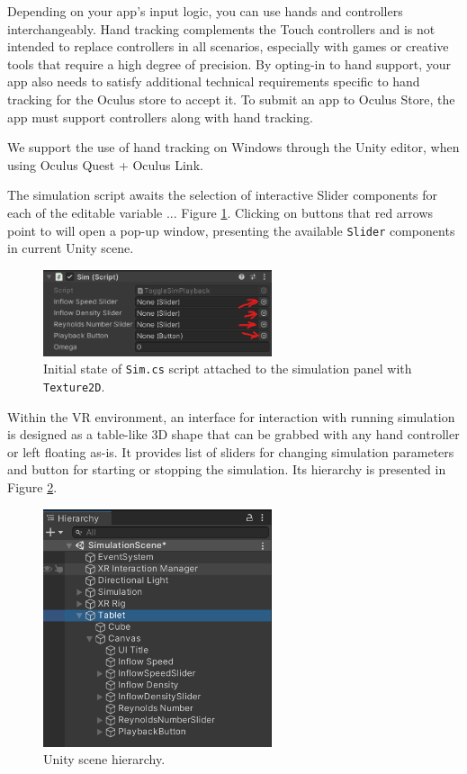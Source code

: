 Depending on your app’s input logic, you can use hands and controllers interchangeably. Hand tracking complements the Touch controllers and is not intended to replace controllers in all scenarios, especially with games or creative tools that require a high degree of precision. By opting-in to hand support, your app also needs to satisfy additional technical requirements specific to hand tracking for the Oculus store to accept it. To submit an app to Oculus Store, the app must support controllers along with hand tracking.

We support the use of hand tracking on Windows through the Unity editor, when using Oculus Quest + Oculus Link. 


The simulation script awaits the selection of interactive Slider components for each of the editable variable ... Figure \ref{fig:sim-script}. Clicking on buttons that red arrows point to will open a pop-up window, presenting the available \texttt{Slider} components in current Unity scene.

\begin{figure}[!ht]
	\centering
	\includegraphics[width=0.6\textwidth]{figures/sim-script.png}
	\caption{Initial state of \texttt{Sim.cs} script attached to the simulation panel with \texttt{Texture2D}.}
	\label{fig:sim-script}
\end{figure}

Within the VR environment, an interface for interaction with running simulation is designed as a table-like 3D shape that can be grabbed with any hand controller or left floating as-is. It provides list of sliders for changing simulation parameters and button for starting or stopping the simulation. Its hierarchy is presented in Figure \ref{fig:unity-scene-hierarchy}.

\begin{figure}[!ht]
	\centering
	\includegraphics[width=0.6\textwidth]{figures/tablet-ui-hierarchy.png}
	\caption{Unity scene hierarchy.}
	\label{fig:unity-scene-hierarchy}
\end{figure}

